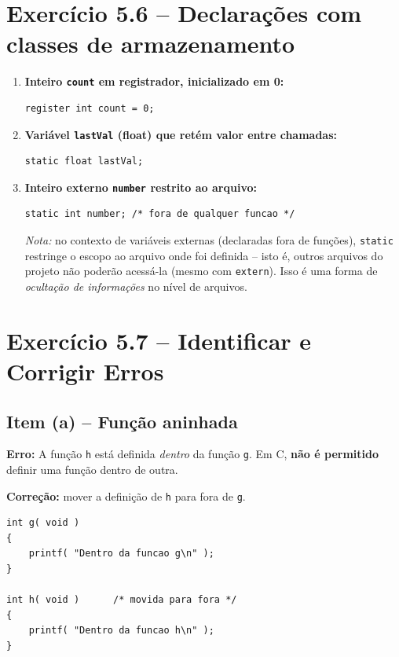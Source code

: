 \documentclass[12pt,a4paper]{article}
\begin{document}
\section{Exercício 5.6 -- Declarações com classes de armazenamento}

\begin{respostabox}
\begin{enumerate}[label=\textbf{\alph*)}]
\item \textbf{Inteiro \texttt{count} em registrador, inicializado em 0:}
\begin{lstlisting}
register int count = 0;
\end{lstlisting}

\item \textbf{Variável \texttt{lastVal} (float) que retém valor entre chamadas:}
\begin{lstlisting}
static float lastVal;
\end{lstlisting}

\item \textbf{Inteiro externo \texttt{number} restrito ao arquivo:}
\begin{lstlisting}
static int number; /* fora de qualquer funcao */
\end{lstlisting}

\textit{Nota:} no contexto de variáveis externas (declaradas fora de funções),
\texttt{static} restringe o escopo ao arquivo onde foi definida -- isto é, outros
arquivos do projeto não poderão acessá-la (mesmo com \texttt{extern}). Isso é uma
forma de \textit{ocultação de informações} no nível de arquivos.
\end{enumerate}
\end{respostabox}

\newpage

\section{Exercício 5.7 -- Identificar e Corrigir Erros}

\subsection*{Item (a) -- Função aninhada}
\begin{respostabox}
\textbf{Erro:} A função \texttt{h} está definida \textit{dentro} da função \texttt{g}.
Em C, \textbf{não é permitido} definir uma função dentro de outra.

\textbf{Correção:} mover a definição de \texttt{h} para fora de \texttt{g}.
\begin{lstlisting}
int g( void )
{
    printf( "Dentro da funcao g\n" );
}

int h( void )      /* movida para fora */
{
    printf( "Dentro da funcao h\n" );
}
\end{lstlisting}
\end{respostabox}
\end{document}
